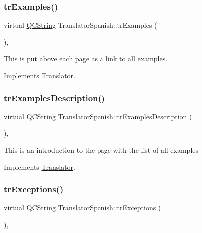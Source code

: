 \subsubsection{\texorpdfstring{trExamples()}{trExamples()}}
{\footnotesize\ttfamily virtual \mbox{\hyperlink{class_q_c_string}{Q\+C\+String}} Translator\+Spanish\+::tr\+Examples (\begin{DoxyParamCaption}{ }\end{DoxyParamCaption})\hspace{0.3cm}{\ttfamily [inline]}, {\ttfamily [virtual]}}

This is put above each page as a link to all examples. 

Implements \mbox{\hyperlink{class_translator}{Translator}}.

\mbox{\label{class_translator_spanish_a0453293e8d3a48413220523d88df5efe}} 
\subsubsection{\texorpdfstring{trExamplesDescription()}{trExamplesDescription()}}
{\footnotesize\ttfamily virtual \mbox{\hyperlink{class_q_c_string}{Q\+C\+String}} Translator\+Spanish\+::tr\+Examples\+Description (\begin{DoxyParamCaption}{ }\end{DoxyParamCaption})\hspace{0.3cm}{\ttfamily [inline]}, {\ttfamily [virtual]}}

This is an introduction to the page with the list of all examples 

Implements \mbox{\hyperlink{class_translator}{Translator}}.

\mbox{\label{class_translator_spanish_a8652fca8bce7968d21131c1ecfbd2785}} 
\subsubsection{\texorpdfstring{trExceptions()}{trExceptions()}}
{\footnotesize\ttfamily virtual \mbox{\hyperlink{class_q_c_string}{Q\+C\+String}} Translator\+Spanish\+::tr\+Exceptions (\begin{DoxyParamCaption}{ }\end{DoxyParamCaption})\hspace{0.3cm}{\ttfamily [inline]}, {\ttfamily [virtual]}}

